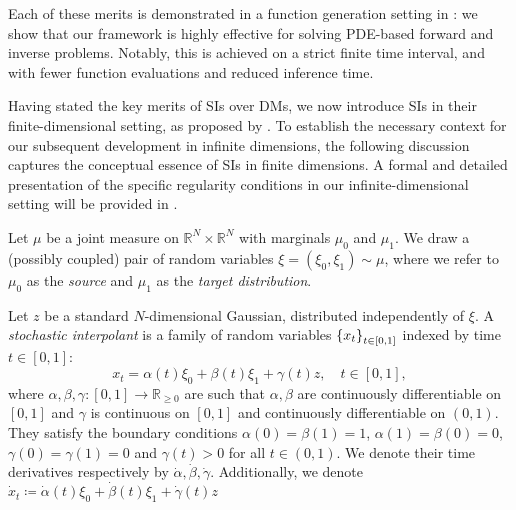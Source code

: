 Each of these merits is demonstrated in a function generation setting in : we show that our framework is highly effective for solving PDE-based forward and inverse problems. Notably, this is achieved on a strict finite time interval, and with fewer function evaluations and reduced inference time.

Having stated the key merits of SIs over DMs, we now introduce SIs in their finite-dimensional setting, as proposed by \citet{albergo2023stochasticinterpolantsunifyingframework,albergo2023stochastic}. To establish the necessary context for our subsequent development in infinite dimensions, the following discussion captures the conceptual essence of SIs in finite dimensions. A formal and detailed presentation of the specific regularity conditions in our infinite-dimensional setting will be provided in .

Let \(\mu\) be a joint measure on \(\mathbb{R}^{N} \times \mathbb{R}^{N}\) with marginals \(\mu_{0}\) and \(\mu_{1}\). We draw a (possibly coupled) pair of random variables \(\xi = (\xi_{0}, \xi_{1}) \sim \mu\), where we refer to \(\mu_{0}\) as the \textit{source} and \(\mu_{1}\) as the \textit{target distribution}.



Let \(z\) be a standard \(N\)-dimensional Gaussian, distributed independently of \(\xi\). A \textit{stochastic interpolant} is a family of random variables \(\qty{x_{t}}_{t \in [0, 1]}\) indexed by time \(t \in [0, 1]\):
\[
  x_{t} = \alpha(t) \xi_{0} + \beta(t) \xi_{1} + \gamma(t)z, \quad t \in [0, 1],
\]
where \(\alpha, \beta, \gamma : [0, 1] \to \mathbb{R}_{\geq 0}\) are such that \(\alpha, \beta\) are  continuously differentiable on \([0, 1]\) and \(\gamma\) is continuous on \([0, 1]\) and continuously differentiable on \((0, 1)\). They satisfy the boundary conditions \(\alpha(0) =  \beta(1) = 1\), \(\alpha(1) = \beta(0) = 0\), \(\gamma(0) = \gamma(1) = 0\) and \(\gamma(t) > 0\) for all \(t \in (0, 1)\). We denote their time derivatives respectively by \(\dot{\alpha}, \dot{\beta}, \dot{\gamma}\). Additionally, we denote \(\dot{x}_{t} \coloneqq \dot{\alpha}(t)\xi_{0} + \dot{\beta}(t) \xi_{1} + \dot{\gamma}(t) z\)

